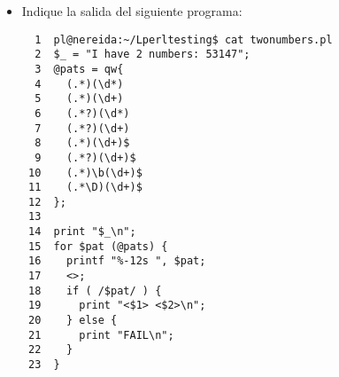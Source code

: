 
\begin{exercise}
\begin{itemize}
\item
Indique la salida del siguiente programa:
\begin{latexonly}
\begin{verbatim}
  1  pl@nereida:~/Lperltesting$ cat twonumbers.pl
  2  $_ = "I have 2 numbers: 53147";
  3  @pats = qw{
  4    (.*)(\d*)
  5    (.*)(\d+)
  6    (.*?)(\d*)
  7    (.*?)(\d+)
  8    (.*)(\d+)$
  9    (.*?)(\d+)$
 10    (.*)\b(\d+)$
 11    (.*\D)(\d+)$
 12  };
 13  
 14  print "$_\n";
 15  for $pat (@pats) {
 16    printf "%-12s ", $pat;
 17    <>;
 18    if ( /$pat/ ) {
 19      print "<$1> <$2>\n";
 20    } else {
 21      print "FAIL\n";
 22    }
 23  }
\end{verbatim}
\end{latexonly}
\begin{rawhtml}


\end{rawhtml}
\end{itemize}
\end{exercise}
